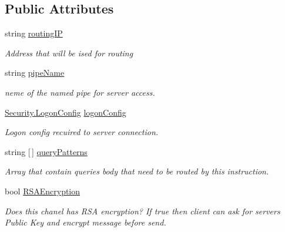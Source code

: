 \subsection*{Public Attributes}
\begin{DoxyCompactItemize}
\item 
string \mbox{\hyperlink{class_pipes_provider_1_1_networking_1_1_routing_1_1_instruction_adb75f80ff34fab644305856ccf23d07b}{routing\+IP}}
\begin{DoxyCompactList}\small\item\em Address that will be ised for routing \end{DoxyCompactList}\item 
string \mbox{\hyperlink{class_pipes_provider_1_1_networking_1_1_routing_1_1_instruction_abe54e245df8dd26547b0c881b987202b}{pipe\+Name}}
\begin{DoxyCompactList}\small\item\em neme of the named pipe for server access. \end{DoxyCompactList}\item 
\mbox{\hyperlink{struct_pipes_provider_1_1_security_1_1_logon_config}{Security.\+Logon\+Config}} \mbox{\hyperlink{class_pipes_provider_1_1_networking_1_1_routing_1_1_instruction_a2a3325abd7537b7a961626272634e038}{logon\+Config}}
\begin{DoxyCompactList}\small\item\em Logon config recuired to server connection. \end{DoxyCompactList}\item 
string \mbox{[}$\,$\mbox{]} \mbox{\hyperlink{class_pipes_provider_1_1_networking_1_1_routing_1_1_instruction_aa98823848a42831095f92b639121cc67}{query\+Patterns}}
\begin{DoxyCompactList}\small\item\em Array that contain querie\textquotesingle{}s body that need to be routed by this instruction. \end{DoxyCompactList}\item 
bool \mbox{\hyperlink{class_pipes_provider_1_1_networking_1_1_routing_1_1_instruction_a61ce6ffa8bb9cc44efc57bc51be3550b}{R\+S\+A\+Encryption}}
\begin{DoxyCompactList}\small\item\em Does this chanel has R\+SA encryption? If true then client can ask for server\textquotesingle{}s Public Key and encrypt message before send. \end{DoxyCompactList}\end{DoxyCompactItemize}
